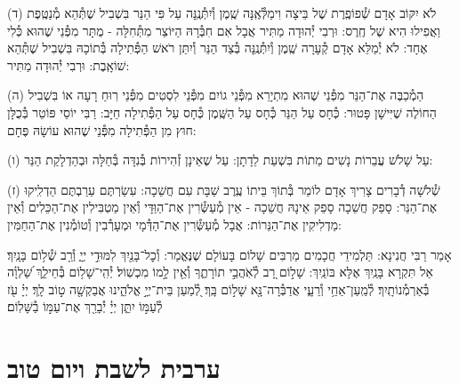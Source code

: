\documentclass[twoside, openany, parskip=half, 11pt]{book}
\begin{document}
(ד) לֹא יִקּוֹב אָדָם שְׁ֯פוֹפֶֽרֶת שֶׁל בֵּיצָה וִימַלְּ֯אֶֽנָּה שֶֽׁמֶן וְ֯יִתְּ֯נֶֽנָּה עַל פִּי הַנֵּר בִּשְׁבִיל שֶׁתְּ֯הֵא מְ֯נַטֶּֽפֶת וַאֲפִילוּ הִיא שֶׁל חֶֽרֶס: וּרְבִי יְ֯הוּדָה מַתִּיר אֲבָל אִם חִבְּ֯רָהּ הַיּוֹצֵר מִתְּ֯חִלָּה - מֻתָּר מִפְּ֯נֵי שֶׁהוּא כְּ֯לִי אֶחָד: לֹא יְ֯מַלֵּא אָדָם קְ֯עָרָה שֶֽׁמֶן וְ֯יִתְּ֯נֶֽנָּה בְּ֯צַד הַנֵּר וְ֯יִתֵּן רֹאשׁ הַפְּ֯תִילָה בְּ֯תוֹכָהּ בִּשְׁבִיל שֶׁתְּ֯הֵא שׁוֹאָֽבֶת: וּרְבִי יְ֯הוּדָה מַתִּיר:

(ה) הַמְ֯כַבֶּה אֶת־הַנֵּר מִפְּ֯נֵי שֶׁהוּא מִתְיָרֵא מִפְּ֯נֵי גוֹיִם מִפְּ֯נֵי לִסְטִים מִפְּ֯נֵי רֽוּחַ רָעָה אוֹ בִּשְׁבִיל הַחוֹלֶה שֶׁיִּישָׁן פָּטוּר: כְּ֯חָס עַל הַנֵּר כְּ֯חָס עַל הַשֶּֽׁמֶן כְּ֯חָס עַל הַפְּ֯תִילָה חַיָּב: רַבִּי יוֹסֵי פּוֹטֵר בְּ֯כֻלָּן חוּץ מִן הַפְּ֯תִילָה מִפְּ֯נֵי שֶׁהוּא עוֹשָׂהּ פֶּחָם:

(ו) עַל שָׁלֹשׁ עֲבֵרוֹת נָשִׁים מֵתוֹת בִּשְׁעַת לֵדָתָן: עַל שֶׁאֵינָן זְ֯הִירוֹת בְּ֯נִדָּה בְּ֯חַלָּה וּבְהַדְלָקַת הַנֵּר:

(ז) שְׁ֯לֹשָׁה דְ֯בָרִים צָרִיךְ אָדָם לוֹמַר בְּ֯תוֹךְ בֵּיתוֹ עֶֽרֶב שַׁבָּת עִם חֲשֵׁכָה: עִשַׂרְתֶּם עֵרַבְתֶּם הַדְלִֽיקוּ אֶת־הַנֵּר: סָפֵק חֲשֵׁכָה סָפֵק אֵינָהּ חֲשֵׁכָה - אֵין מְ֯עַשְּׂ֯רִין אֶת־הַוַּדָּי וְ֯אֵין מַטְבִּילִין אֶת־הַכֵּלִים וְ֯אֵין מַדְלִיקִין אֶת־הַנֵּרוֹת: אֲבָל מְ֯עַשְּׂ֯רִין אֶת־הַדְּ֯מָי וּמְעָרְ֯בִין וְ֯טוֹמְ֯נִין אֶת־הַחַמִּין:


 
אָמַר רַבִּי חֲנִינָא: תַּלְמִידֵי חֲכָמִים מַרְבִּים שָׁלוֹם בָּעוֹלָם שֶׁנֶּאֱמַר:
וְ֯כׇל־בָּנַ֖יִךְ לִמּוּדֵ֣י יְיָ֑ וְ֯רַ֖ב שְׁ֯ל֥וֹם בָּנָֽיִךְ׃ אַל תִּקְרָא בָּנַֽיִךְ אֶלָּא בּוֹנַֽיִךְ: שָׁל֣וֹם רָ֭ב לְ֯אֹֽהֲבֵ֣י תוֹרָתֶ֑ךָ וְ֯אֵ֖ין לָ֣מוֹ מִכְשֽׁוֹל׃ יְ֯הִֽי־שָׁל֥וֹם בְּ֯חֵילֵ֑ךְ שַׁ֝לְוָ֗ה בְּ֯אַרְמְ֯נוֹתָֽיִךְ׃ לְ֯מַֽעַן־אַחַ֥י וְ֯רֵעָ֑י אֲדַבְּ֯רָה־נָּ֖א שָׁל֣וֹם בָּֽךְ׃ לְ֭֯מַעַן בֵּית־יְיָ֣ אֱלֹהֵ֑ינוּ אֲבַקְשָׁ֖ה ט֣וֹב לָֽךְ׃
יְיָ֗ עֹ֖ז לְ֯עַמּ֣וֹ יִתֵּ֑ן יְיָ֓ יְ֯בָרֵ֖ךְ אֶת־עַמּ֣וֹ בַ֯שָּׁלֽוֹם׃


\mournerskaddish

\vspace{\baselineskip}

{\let\clearpage\relax
\chapter[ערבית לשבת ויו״ט]{ ערבית לשבת ויום טוב }}

\barachu

\hamaarivaravim

\ahavasolam

\shema

\veahavta
\end{document}
